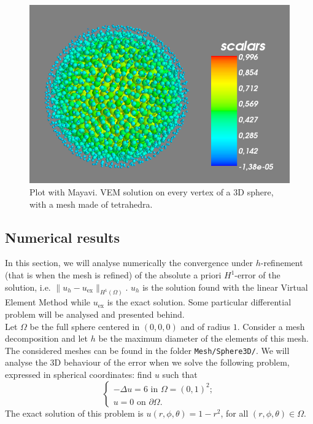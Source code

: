 \begin{figure}[!h]
\centering
\includegraphics[scale=0.35]{images/mayavi3DPoints.png}
\caption{Plot with Mayavi. VEM solution on every vertex of a $3$D sphere, with a mesh made of tetrahedra.}
\label{img:mayavi3D}
\end{figure}

\subsection{Numerical results}

In this section, we will analyse numerically the convergence under $h$-refinement (that is when the mesh is refined) of the absolute a priori $H^1$-error of the solution, i.e. $\|u_h-u_{\text{ex}}\|_{H^1(\Omega)}$. $u_h$ is the solution found with the linear Virtual Element Method while $u_{\text{ex}}$ is the exact solution. Some particular differential problem will be analysed and presented behind.\\

Let $\Omega$ be the full sphere centered in $(0,0,0)$ and of radius $1$. Consider a mesh decomposition and let $h$ be the maximum diameter of the elements of this mesh. The considered meshes can be found in the folder \verb!Mesh/Sphere3D/!. We will analyse the $3$D behaviour of the error when we solve the following problem, expressed in spherical coordinates: find $u$ such that 
\begin{equation*}
\begin{cases}
-\Delta u = 6 \text{ in } \Omega = (0,1)^2;\\
u = 0 \text{ on } \partial \Omega.
\end{cases}
\end{equation*}
The exact solution of this problem is $u(r,\phi,\theta)=1-r^2$, for all $(r,\phi,\theta)\in\Omega$. \\

